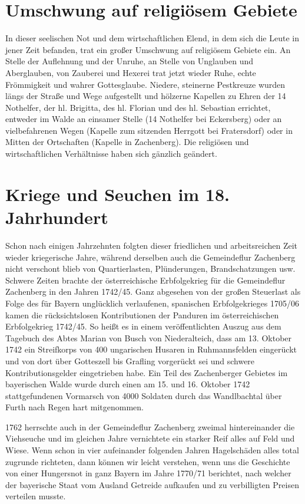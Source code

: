 \documentclass{book}
\begin{document}
\section{Umschwung auf religiösem Gebiete}

In dieser seelischen Not und dem wirtschaftlichen Elend, in dem sich die Leute
in jener Zeit befanden, trat ein großer Umschwung auf religiösem Gebiete ein. An
Stelle der Auflehnung und der Unruhe, an Stelle von Unglauben und Aberglauben,
von Zauberei und Hexerei trat jetzt wieder Ruhe, echte Frömmigkeit und wahrer
Gottesglaube. Niedere, steinerne Pestkreuze wurden längs der Straße und Wege
aufgestellt und hölzerne Kapellen zu Ehren der 14 Nothelfer, der hl. Brigitta,
des hl. Florian und des hl. Sebastian errichtet, entweder im Walde an einsamer
Stelle (14 Nothelfer bei Eckersberg) oder an vielbefahrenen Wegen (Kapelle zum
sitzenden Herrgott bei Fratersdorf) oder in Mitten der Ortschaften (Kapelle in
Zachenberg). Die religiösen und wirtschaftlichen Verhältnisse haben sich
gänzlich geändert.

\section{Kriege und Seuchen im 18. Jahrhundert}

Schon nach einigen Jahrzehnten folgten dieser friedlichen und arbeitsreichen
Zeit wieder kriegerische Jahre, während derselben auch die Gemeindeflur
Zachenberg nicht verschont blieb von Quartierlasten, Plünderungen,
Brandschatzungen usw. Schwere Zeiten brachte der österreichische Erbfolgekrieg
für die Gemeindeflur Zachenberg in den Jahren 1742/45. Ganz abgesehen von der
großen Steuerlast als Folge des für Bayern unglücklich verlaufenen, spanischen
Erbfolgekrieges 1705/06 kamen die rücksichtslosen Kontributionen der Panduren im
österreichischen Erbfolgekrieg 1742/45. So heißt es in einem veröffentlichten
Auszug aus dem Tagebuch des Abtes Marian von Busch von Niederalteich, dass am
13. Oktober 1742 ein Streifkorps von 400 ungarischen Husaren in Ruhmannsfelden
eingerückt und von dort über Gotteszell bis Grafling vorgerückt sei und schwere
Kontributionsgelder eingetrieben habe. Ein Teil des Zachenberger Gebietes im
bayerischen Walde wurde durch einen am 15. und 16. Oktober 1742 stattgefundenen
Vormarsch von 4000 Soldaten durch das Wandlbachtal über Furth nach Regen hart
mitgenommen.

1762 herrschte auch in der Gemeindeflur Zachenberg zweimal hintereinander die
Viehseuche und im gleichen Jahre vernichtete ein starker Reif alles auf Feld und
Wiese. Wenn schon in vier aufeinander folgenden Jahren Hagelschäden alles total
zugrunde richteten, dann können wir leicht verstehen, wenn uns die Geschichte
von einer Hungersnot in ganz Bayern im Jahre 1770/71 berichtet, nach welcher der
bayerische Staat vom Ausland Getreide aufkaufen und zu verbilligten Preisen
verteilen musste.
\end{document}
